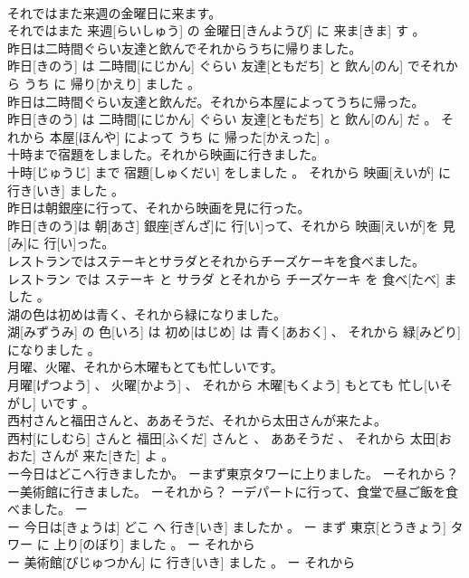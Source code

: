 \documentclass[8pt]{extreport}
\begin{document}
\begin{CJK}{UTF8}{min}
\\	それではまた来週の金曜日に来ます。	
\\	それではまた 来週[らいしゅう] の 金曜日[きんようび] に 来ま[きま] す 。
\\	昨日は二時間ぐらい友達と飲んでそれからうちに帰りました。	
\\	昨日[きのう] は 二時間[にじかん] ぐらい 友達[ともだち] と 飲ん[のん] でそれから うち に 帰り[かえり] ました 。
\\	昨日は二時間ぐらい友達と飲んだ。それから本屋によってうちに帰った。	
\\	昨日[きのう] は 二時間[にじかん] ぐらい 友達[ともだち] と 飲ん[のん] だ 。 それから 本屋[ほんや] によって うち に 帰った[かえった] 。
\\	十時まで宿題をしました。それから映画に行きました。	
\\	十時[じゅうじ] まで 宿題[しゅくだい] をしました 。 それから 映画[えいが] に 行き[いき] ました 。
\\	昨日は朝銀座に行って、それから映画を見に行った。	
\\	昨日[きのう]は 朝[あさ] 銀座[ぎんざ]に 行[い]って、それから 映画[えいが]を 見[み]に 行[い]った。
\\	レストランではステーキとサラダとそれからチーズケーキを食べました。	
\\	レストラン では ステーキ と サラダ とそれから チーズケーキ を 食べ[たべ] ました 。
\\	湖の色は初めは青く、それから緑になりました。	
\\	湖[みずうみ] の 色[いろ] は 初め[はじめ] は 青く[あおく] 、 それから 緑[みどり] になりました 。
\\	月曜、火曜、それから木曜もとても忙しいです。	
\\	月曜[げつよう] 、 火曜[かよう] 、 それから 木曜[もくよう] もとても 忙し[いそがし] いです 。
\\	西村さんと福田さんと、ああそうだ、それから太田さんが来たよ。	
\\	西村[にしむら] さんと 福田[ふくだ] さんと 、 ああそうだ 、 それから 太田[おおた] さんが 来た[きた] よ 。
\\	ー今日はどこへ行きましたか。 ーまず東京タワーに上りました。 ーそれから？ ー美術館に行きました。 ーそれから？ ーデパートに行って、食堂で昼ご飯を食べました。	ー
\\	ー 今日は[きょうは] どこ へ 行き[いき] ましたか 。 ー まず 東京[とうきょう] タワー に 上り[のぼり] ました 。 ー それから 
\\	ー 美術館[びじゅつかん] に 行き[いき] ました 。 ー それから 

\end{CJK}
\end{document}
